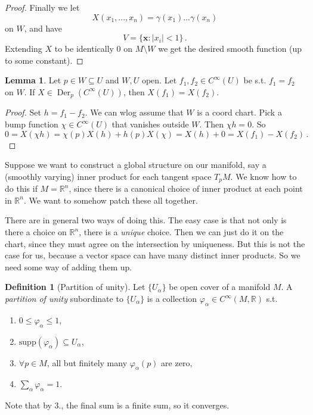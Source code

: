 \documentclass[a4paper,11pt]{article}
\theoremstyle{definition}
\newtheorem*{defn}{Definition}
\newtheorem*{lem}{Lemma}
\DeclareMathOperator{\Der}{Der}
\numberwithin{equation}{section}
\begin{document}
\begin{proof}
Finally we let
\[
X(x_1,...,x_n)=\gamma(x_1)...\gamma(x_n)
\]
on $W$, and have
\[
V=\{\mathbf{x}:|x_i|<1\}\,.
\]
Extending $X$ to be identically 0 on $M\setminus W$ we get the desired smooth function (up to some constant).
\end{proof}

\begin{lem}
Let $p\in W\subseteq U$ and $W, U$ open. Let $f_1, f_2\in C^\infty(U)$ be s.t. $f_1=f_2$ on $W$. If $X\in\Der_p(C^\infty(U))$, then $X(f_1)=X(f_2)$.
\end{lem}

\begin{proof}
Set $h=f_1-f_2$. We can wlog assume that $W$ is a coord chart. Pick a bump function $\chi\in C^\infty(U)$ that vanishes outside $W$. Then $\chi h=0$. So
\[
0=X(\chi h)=\chi(p)X(h)+h(p)X(\chi)=X(h)+0=X(f_1)-X(f_2)\,.
\]
\end{proof}

Suppose we want to construct a global structure on our manifold, say a (smoothly varying) inner product for each tangent space $T_pM$. We know how to do this if $M=\mathbb{R}^n$, since there is a canonical choice of inner product at each point in $\mathbb{R}^n$. We want to somehow patch these all together.

There are in general two ways of doing this. The easy case is that not only is there a choice on $\mathbb{R}^n$, there is a \emph{unique} choice. Then we can just do it on the chart, since they must agree on the intersection by uniqueness. But this is not the case for us, because a vector space can have many distinct inner products. So we need some way of adding them up.

\begin{defn}[Partition of unity]
Let $\{U_\alpha\}$ be open cover of a manifold $M$. A \emph{partition of unity} subordinate to $\{U_\alpha\}$ is a collection $\varphi_\alpha\in C^\infty(M,\mathbb{R})$ s.t.
\begin{enumerate}
    \item $0\leq\varphi_\alpha\leq 1$,
    \item $\text{supp}(\varphi_\alpha)\subseteq U_\alpha$,
    \item $\forall p\in M$, all but finitely many $\varphi_\alpha(p)$ are zero,
    \item $\sum_\alpha\varphi_\alpha=1$.
\end{enumerate}
Note that by 3., the final sum is a finite sum, so it converges.
\end{defn}
\end{document}
